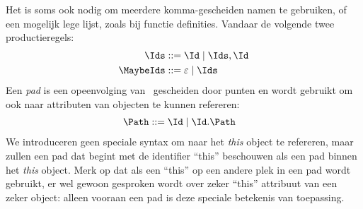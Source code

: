 Het is soms ook nodig om meerdere komma-gescheiden namen te gebruiken, of een mogelijk lege lijst, zoals bij functie definities. Vandaar de volgende twee productieregels:
%
\begin{align*}
  \Ids \GrammarDef \Id \mid \Ids, \Id \\
  \MaybeIds \GrammarDef \varepsilon \mid \Ids
\end{align*}
%
Een \emph{pad} is een opeenvolging van \Ids\ gescheiden door punten en wordt gebruikt om ook naar attributen van objecten te kunnen refereren:
%
\begin{align*}
  \Path \GrammarDef \Id \mid \Id . \Path
\end{align*}
%
We introduceren geen speciale syntax om naar het \emph{this} object te refereren, maar zullen een pad dat begint met de identifier “this” beschouwen als een pad binnen het \emph{this} object. Merk op dat als een “this” op een andere plek in een pad wordt gebruikt, er wel gewoon gesproken wordt over zeker “this” attribuut van een zeker object: alleen vooraan een pad is deze speciale betekenis van toepassing.

